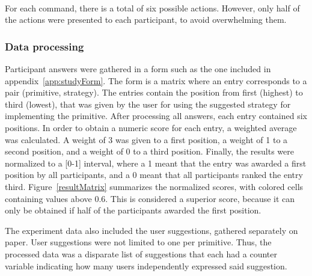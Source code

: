 \hfill\\
For each command, there is a total of six possible actions.
However, only half of the actions were presented to each participant, to avoid overwhelming them. 
%

\subsubsection{Data processing}

Participant answers were gathered in a form such as the one included in appendix~\ref{app:studyForm}.
The form is a matrix where an entry corresponds to a pair (primitive, strategy).
The entries contain the position from first (highest) to third (lowest), that was given by the user for using the suggested strategy for implementing the primitive.
After processing all answers, each entry contained six positions.
In order to obtain a numeric score for each entry, a weighted average was calculated.
A weight of 3 was given to a first position, a weight of 1 to a second position, and a weight of 0 to a third position.
Finally, the results were normalized to a [0-1] interval, where a 1 meant that the entry was awarded a first position by all participants, and a 0 meant that all participants ranked the entry third.
Figure~\ref{resultMatrix} summarizes the normalized scores, with colored cells containing values above 0.6.
This is considered a superior score, because it can only be obtained if half of the participants awarded the first position.

The experiment data also included the user suggestions, gathered separately on paper.
User suggestions were not limited to one per primitive.
Thus, the processed data was a disparate list of suggestions that each had a counter variable indicating how many users independently expressed said suggestion.

